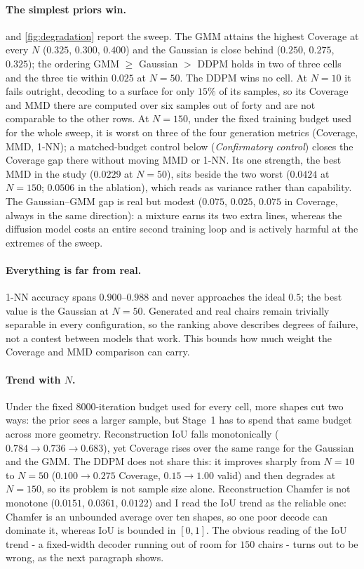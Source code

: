 \documentclass[11pt]{article}
\begin{document}
\paragraph{The simplest priors win.}  and
\cref{fig:degradation} report the sweep. The GMM attains the highest Coverage at
every $N$ ($0.325$, $0.300$, $0.400$) and the Gaussian is close behind ($0.250$,
$0.275$, $0.325$); the ordering GMM $\ge$ Gaussian $>$ DDPM holds in two of three
cells and the three tie within $0.025$ at $N=50$. The DDPM wins no cell. At
$N=10$ it fails outright, decoding to a surface for only $15\%$ of its samples,
so its Coverage and MMD there are computed over six samples out of forty and are
not comparable to the other rows. At $N=150$, under the fixed training budget
used for the whole sweep, it is worst on three of the four generation metrics
(Coverage, MMD, 1-NN); a matched-budget control below (\emph{Confirmatory
control}) closes the Coverage gap there without moving MMD or 1-NN. Its one
strength, the best MMD in the study ($0.0229$ at $N=50$), sits
beside the two worst ($0.0424$ at $N=150$; $0.0506$ in the ablation), which reads
as variance rather than capability. The Gaussian--GMM gap is real but modest
($0.075$, $0.025$, $0.075$ in Coverage, always in the same direction): a mixture
earns its two extra lines, whereas the diffusion model costs an entire second
training loop and is actively harmful at the extremes of the sweep.

\paragraph{Everything is far from real.} 1-NN accuracy spans $0.900$--$0.988$ and
never approaches the ideal $0.5$; the best value is the Gaussian at $N=50$.
Generated and real chairs remain trivially separable in every configuration, so
the ranking above describes degrees of failure, not a contest between models that
work. This bounds how much weight the Coverage and MMD comparison can carry.

\paragraph{Trend with $N$.} Under the fixed $8000$-iteration budget used for
every cell, more shapes cut two ways: the prior sees a larger sample, but
Stage~1 has to spend that same budget across more geometry. Reconstruction
IoU falls monotonically ($0.784 \to 0.736 \to 0.683$), yet Coverage rises over
the same range for the Gaussian and the GMM. The DDPM does not share this: it
improves sharply from $N=10$ to $N=50$ ($0.100 \to 0.275$ Coverage, $0.15 \to
1.00$ valid) and then degrades at $N=150$, so its problem is not sample size
alone. Reconstruction Chamfer is not monotone ($0.0151$, $0.0361$, $0.0122$) and
I read the IoU trend as the reliable one: Chamfer is an unbounded average over
ten shapes, so one poor decode can dominate it, whereas IoU is bounded in
$[0,1]$. The obvious reading of the IoU trend - a fixed-width decoder running
out of room for $150$ chairs - turns out to be wrong, as the next paragraph
shows.
\end{document}
